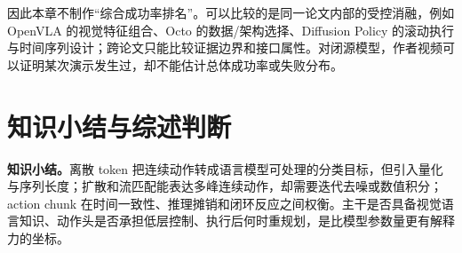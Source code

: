 因此本章不制作“综合成功率排名”。可以比较的是同一论文内部的受控消融，例如 OpenVLA 的视觉特征组合、Octo 的数据/架构选择、Diffusion Policy 的滚动执行与时间序列设计；跨论文只能比较证据边界和接口属性。对闭源模型，作者视频可以证明某次演示发生过，却不能估计总体成功率或失败分布。

\section{知识小结与综述判断}

\textbf{知识小结。}离散 token 把连续动作转成语言模型可处理的分类目标，但引入量化与序列长度；扩散和流匹配能表达多峰连续动作，却需要迭代去噪或数值积分；action chunk 在时间一致性、推理摊销和闭环反应之间权衡。主干是否具备视觉语言知识、动作头是否承担低层控制、执行后何时重规划，是比模型参数量更有解释力的坐标。

